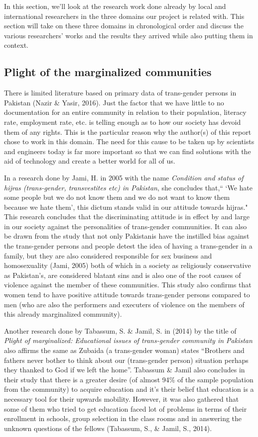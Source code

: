 In this section, we'll look at the research work done already by local and international researchers in the three domains our project is related with. This section will take on these three domains in chronological order and discuss the various researchers' works  and the results they arrived while also putting them in context.

\subsection{Plight of the marginalized communities}

There is limited literature based on primary data of trans-gender persons in Pakistan (Nazir \& Yasir, 2016). Just the factor that we have little to no documentation for an entire community in relation to their population, literacy rate, employment rate, etc. is telling enough as to how our society has devoid them of any rights. This is the particular reason why the author(s) of this report chose to work in this domain. The need for this cause to be taken up by scientists and engineers today is far more important so that we can find solutions with the aid of technology and create a better world for all of us. 

In a research done by Jami, H. in 2005 with the name \textit {Condition and status of hijras (trans-gender, transvestites etc) in Pakistan}, she concludes that,“ `We hate some people but we do not know them and we do not want to know them because we hate them', this dictum stands valid in our attitude towards hijras." This research concludes that the discriminating attitude is in effect by and large in our society against the personalities of trans-gender communities. It can also be drawn from the study that not only Pakistanis have the instilled bias against the trans-gender persons and people detest the idea of having a trans-gender in a family, but they are also considered responsible for sex business and homosexuality (Jami, 2005) both of which in a society as religiously conservative as Pakistan's, are considered blatant sins and is also one of the root causes of violence against the member of these communities. This study also confirms that women tend to have positive attitude towards trans-gender persons compared to men (who are also the performers and executers of violence on the members of this already marginalized community). 

Another research done by Tabassum, S. \& Jamil, S. in (2014) by the title of \textit {Plight of marginalized: Educational issues of trans-gender community in Pakistan} also affirms the same as Zubaida (a trans-gender woman) states “Brothers and fathers never bother to think about our (trans-gender person) situation perhaps they thanked to God if we left the home”. Tabassum \& Jamil also concludes in their study that there is a greater desire (of almost 94\% of the sample population from the community) to acquire education and it's their belief that education is a necessary tool for their upwards mobility. However, it was also gathered that some of them who tried to get education faced lot of problems in terms of their enrollment in schools, group selection in the class rooms and in answering the unknown questions of the fellows (Tabassum, S., \& Jamil, S., 2014). 

